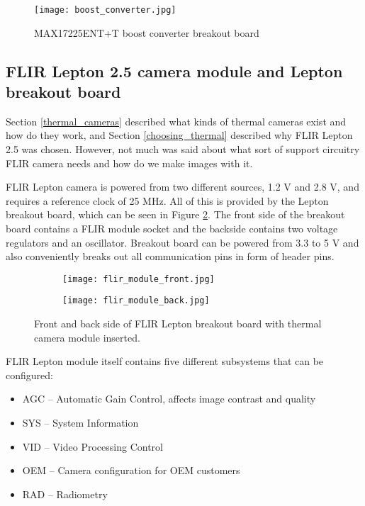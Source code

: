 \begin{figure}[ht]
        \centering
        \texttt{[image: boost\_converter.jpg]} 
        \caption{ MAX17225ENT+T boost converter breakout board}
        \label{boost_converter}
\end{figure}

\subsection{ FLIR Lepton 2.5 camera module and Lepton breakout board}

Section \ref{thermal_cameras} described what kinds of thermal cameras exist and how do they work, and Section \ref{choosing_thermal} described why FLIR Lepton 2.5 was chosen.
However, not much was said about what sort of support circuitry FLIR camera needs and how do we make images with it.

FLIR Lepton camera is powered from two different sources, 1.2 \si{\volt} and 2.8 \si{\volt}, and requires a reference clock of 25 \si{\mega\hertz}.
All of this is provided by the Lepton breakout board, which can be seen in Figure \ref{lepton_breakout}.
The front side of the breakout board contains a FLIR module socket and the backside contains two voltage regulators and an oscillator.
Breakout board can be powered from 3.3 to 5 \si{\volt} and also conveniently breaks out all communication pins in form of header pins.
\newline
\begin{figure}[ht] 
    \begin{subfigure}[b]{0.5\textwidth}
        \centering
        \texttt{[image: flir\_module\_front.jpg]} 
    \end{subfigure}
    \begin{subfigure}[b]{0.5\textwidth}
        \centering
        \texttt{[image: flir\_module\_back.jpg]} 
    \end{subfigure}
    \caption{ Front and back side of FLIR Lepton breakout board with thermal camera module inserted.}
    \label{lepton_breakout}
\end{figure}

FLIR Lepton module itself contains five different subsystems that can be configured:

\begin{itemize}
    \item AGC – Automatic Gain Control, affects image contrast and quality
    \item SYS – System Information
    \item VID – Video Processing Control
    \item OEM – Camera configuration for OEM customers
    \item RAD – Radiometry
\end{itemize}

